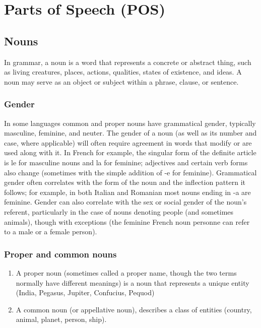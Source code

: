 \section{Parts of Speech (POS)}\label{Parts of Speech (POS)}

\subsection{Nouns \cite{wiki-noun}}
In grammar, a noun is a word that represents a concrete or abstract thing, such as living creatures, places, actions, qualities, states of existence, and ideas. A noun may serve as an object or subject within a phrase, clause, or sentence.
\subsubsection{Gender \cite{wiki-noun}}
In some languages common and proper nouns have grammatical gender, typically masculine, feminine, and neuter. The gender of a noun (as well as its number and case, where applicable) will often require agreement in words that modify or are used along with it. In French for example, the singular form of the definite article is le for masculine nouns and la for feminine; adjectives and certain verb forms also change (sometimes with the simple addition of -e for feminine). Grammatical gender often correlates with the form of the noun and the inflection pattern it follows; for example, in both Italian and Romanian most nouns ending in -a are feminine. Gender can also correlate with the sex or social gender of the noun's referent, particularly in the case of nouns denoting people (and sometimes animals), though with exceptions (the feminine French noun personne can refer to a male or a female person).

\subsubsection{Proper and common nouns \cite{wiki-noun}}
\begin{enumerate}
    \item A proper noun (sometimes called a proper name, though the two terms normally have different meanings) is a noun that represents a unique entity (India, Pegasus, Jupiter, Confucius, Pequod)
    \item A common noun (or appellative noun), describes a class of entities (country, animal, planet, person, ship).
\end{enumerate}

